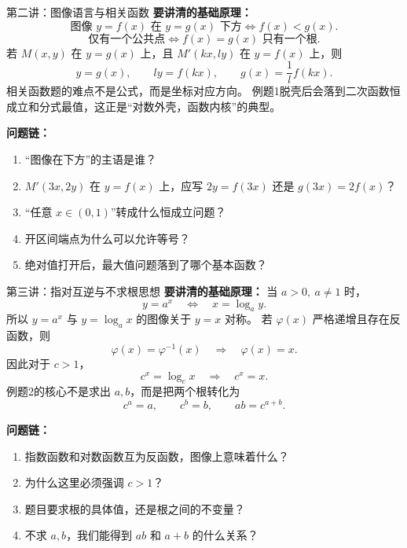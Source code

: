 \documentclass[11pt,a4paper]{ctexart}
\begin{document}
\begin{teachbox}{第二讲：图像语言与相关函数}
\textbf{要讲清的基础原理：}
\[
\text{图像 } y=f(x)\text{ 在 }y=g(x)\text{ 下方}
\Longleftrightarrow
f(x)<g(x).
\]
\[
\text{仅有一个公共点}
\Longleftrightarrow
f(x)=g(x)\text{ 只有一个根}.
\]
若 $M(x,y)$ 在 $y=g(x)$ 上，且 $M'(kx,ly)$ 在 $y=f(x)$ 上，则
\[
y=g(x),\qquad ly=f(kx),\qquad
\boxed{g(x)=\frac1l f(kx).}
\]
相关函数题的难点不是公式，而是坐标对应方向。
例题1脱壳后会落到二次函数恒成立和分式最值，这正是“对数外壳，函数内核”的典型。

\textbf{问题链：}
\begin{enumerate}
  \item “图像在下方”的主语是谁？
  \item $M'(3x,2y)$ 在 $y=f(x)$ 上，应写 $2y=f(3x)$ 还是 $g(3x)=2f(x)$？
  \item “任意 $x\in(0,1)$”转成什么恒成立问题？
  \item 开区间端点为什么可以允许等号？
  \item 绝对值打开后，最大值问题落到了哪个基本函数？
\end{enumerate}
\end{teachbox}

\begin{teachbox}{第三讲：指对互逆与不求根思想}
\textbf{要讲清的基础原理：}
当 $a>0,\ a\ne1$ 时，
\[
y=a^x\quad \Longleftrightarrow \quad x=\log_a y.
\]
所以 $y=a^x$ 与 $y=\log_a x$ 的图像关于 $y=x$ 对称。
若 $\varphi(x)$ 严格递增且存在反函数，则
\[
\varphi(x)=\varphi^{-1}(x)
\quad \Longrightarrow \quad
\varphi(x)=x.
\]
因此对于 $c>1$，
\[
c^x=\log_c x
\quad \Longrightarrow \quad
c^x=x.
\]
例题2的核心不是求出 $a,b$，而是把两个根转化为
\[
c^a=a,\qquad c^b=b,\qquad ab=c^{a+b}.
\]

\textbf{问题链：}
\begin{enumerate}
  \item 指数函数和对数函数互为反函数，图像上意味着什么？
  \item 为什么这里必须强调 $c>1$？
  \item 题目要求根的具体值，还是根之间的不变量？
  \item 不求 $a,b$，我们能得到 $ab$ 和 $a+b$ 的什么关系？
\end{enumerate}
\end{teachbox}
\end{document}
